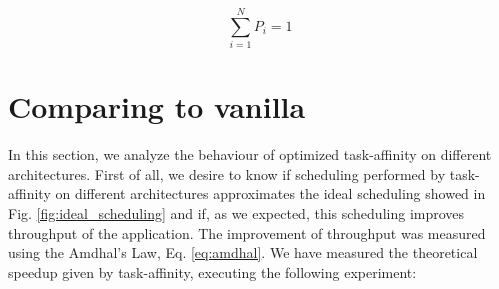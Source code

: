 \begin{equation}
       \sum_{i=1}^N P_{i} = 1
\label{eq:contr_amdhal}
\end{equation}
\newpage

\section{Comparing to vanilla}

In this section, we analyze the behaviour of optimized task-affinity on different architectures. First of all, we desire to know if scheduling performed by 
task-affinity on different architectures approximates the ideal scheduling showed in Fig. \ref{fig:ideal_scheduling} and if, as we expected, this 
scheduling improves throughput of the application. The improvement of throughput was measured using the Amdhal's Law, Eq. \ref{eq:amdhal}. We have measured 
the theoretical speedup given by task-affinity, executing the following experiment:

